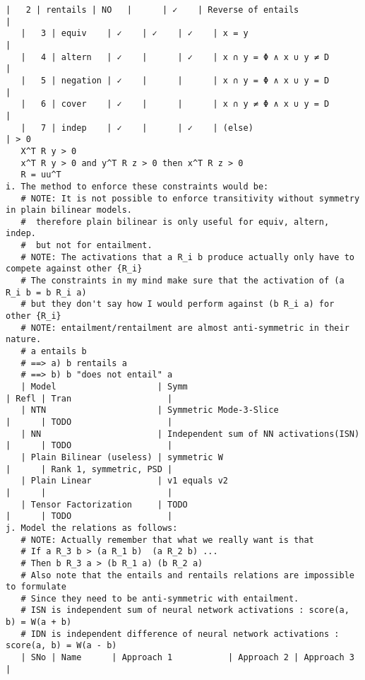 \documentclass[12pt]{exam} %
\begin{document}
{\begin{Verbatim}[fontsize=\small]
   |   2 | rentails | NO   |      | ✓    | Reverse of entails                                                   |
   |   3 | equiv    | ✓    | ✓    | ✓    | x = y                                                                |
   |   4 | altern   | ✓    |      | ✓    | x ∩ y = Φ ∧ x ∪ y ≠ D                                                |
   |   5 | negation | ✓    |      |      | x ∩ y = Φ ∧ x ∪ y = D                                                |
   |   6 | cover    | ✓    |      |      | x ∩ y ≠ Φ ∧ x ∪ y = D                                                |
   |   7 | indep    | ✓    |      | ✓    | (else)                                                               | > 0
   X^T R y > 0
   x^T R y > 0 and y^T R z > 0 then x^T R z > 0
   R = uu^T
i. The method to enforce these constraints would be:
   # NOTE: It is not possible to enforce transitivity without symmetry in plain bilinear models.
   #  therefore plain bilinear is only useful for equiv, altern, indep.
   #  but not for entailment.
   # NOTE: The activations that a R_i b produce actually only have to compete against other {R_i}
   # The constraints in my mind make sure that the activation of (a R_i b = b R_i a)
   # but they don't say how I would perform against (b R_i a) for other {R_i}
   # NOTE: entailment/rentailment are almost anti-symmetric in their nature.
   # a entails b
   # ==> a) b rentails a
   # ==> b) b "does not entail" a
   | Model                    | Symm                                   | Refl | Tran                   |
   | NTN                      | Symmetric Mode-3-Slice                 |      | TODO                   |
   | NN                       | Independent sum of NN activations(ISN) |      | TODO                   |
   | Plain Bilinear (useless) | symmetric W                            |      | Rank 1, symmetric, PSD |
   | Plain Linear             | v1 equals v2                           |      |                        |
   | Tensor Factorization     | TODO                                   |      | TODO                   |
j. Model the relations as follows:
   # NOTE: Actually remember that what we really want is that
   # If a R_3 b > (a R_1 b)  (a R_2 b) ...
   # Then b R_3 a > (b R_1 a) (b R_2 a)
   # Also note that the entails and rentails relations are impossible to formulate
   # Since they need to be anti-symmetric with entailment.
   # ISN is independent sum of neural network activations : score(a, b) = W(a + b)
   # IDN is independent difference of neural network activations : score(a, b) = W(a - b)
   | SNo | Name      | Approach 1           | Approach 2 | Approach 3                      |

\end{Verbatim}}
\end{document}
